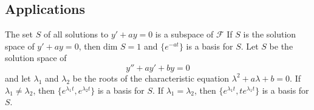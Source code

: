 \documentclass{article}
\begin{document}
    \subsection{Applications}
    \begin{outline}
        \1 The set $S$ of all solutions to \(y'+ay=0\) is a subspace of \(\mathscr F\)
        \1 If $S$ is the solution space of \(y'+ay=0\), then \(\text{dim }S=1\) and \(\{e^{-at}\}\) is a basis for $S$. 
        \1 Let $S$ be the solution space of \[y''+ay'+by=0\] and let \(\lambda_1\) and \(\lambda_2\) be the roots of the characteristic equation \(\lambda^2+a\lambda+b=0\). 
            \2 If \(\lambda_1\neq\lambda_2\), then \(\{e^{\lambda_1t},e^{\lambda_2t}\}\) is a basis for $S$. 
            \2 If \(\lambda_1=\lambda_2\), then \(\{e^{\lambda_1t},te^{\lambda_1t}\}\) is a basis for $S$. 
            
    \end{outline}
\end{document}
